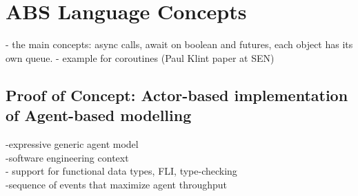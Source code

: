 \section{ABS Language Concepts}
- the main concepts: async calls, await on boolean and futures, each object has its own queue.
- example for coroutines (Paul Klint paper at SEN)

\subsection{Proof of Concept: Actor-based implementation of Agent-based modelling}
-expressive generic agent model \\
-software engineering context \\
- support for functional data types, FLI, type-checking\\
-sequence of events that maximize agent throughput\\
